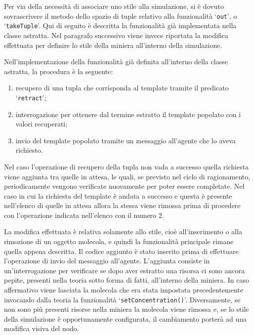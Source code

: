 Per via della necessità di associare uno stile alla simulazione, si è dovuto sovrascrivere il metodo dello spazio di tuple relativo alla funzionalità `\texttt{out}', o `\texttt{takeTuple}'.
Qui di seguito è descritta la funzionalità già implementata nella classe astratta. Nel paragrafo successivo viene invece riportata la modifica effettuata per definire lo stile della miniera all'interno della simulazione.

Nell'implementazione della funzionalità già definita all'interno della classe astratta, la procedura è la seguente:
\begin{enumerate}
\item recupero di una tupla che corrisponda al template tramite il predicato `\texttt{retract}';
\item interrogazione per ottenere dal termine estratto il template popolato con i valori recuperati;
\item invio del template popolato tramite un messaggio all'agente che lo aveva richiesto.
\end{enumerate}
Nel caso l'operazione di recupero della tupla non vada a successo quella richiesta viene aggiunta tra quelle in attesa, le quali, se previsto nel ciclo di ragionamento, periodicamente vengono verificate nuovamente per poter essere completate.
Nel caso in cui la richiesta del template è andata a successo e questa è presente nell'elenco di quelle in attesa allora la stessa viene rimossa prima di procedere con l'operazione indicata nell'elenco con il numero 2.

La modifica effettuata è relativa solamente allo stile, cioè all'inserimento o alla rimozione di un oggetto molecola, e quindi la funzionalità principale rimane quella appena descritta.
Il codice aggiunto è stato inserito prima di effettuare l'operazione di invio del messaggio all'agente. L'aggiunta consiste in un'interrogazione per verificare se dopo aver estratto una risorsa ci sono ancora pepite, presenti nella teoria sotto forma di fatti, all'interno della miniera. In caso affermativo viene lasciata la molecola che era stata impostata precedentemente invocando dalla teoria la funzionalità `\texttt{setConcentration()}'. Diversamente, se non sono più presenti risorse nella miniera la molecola viene rimossa e, se lo stile della simulazione è opportunamente configurata, il cambiamento porterà ad una modifica visiva del nodo.

